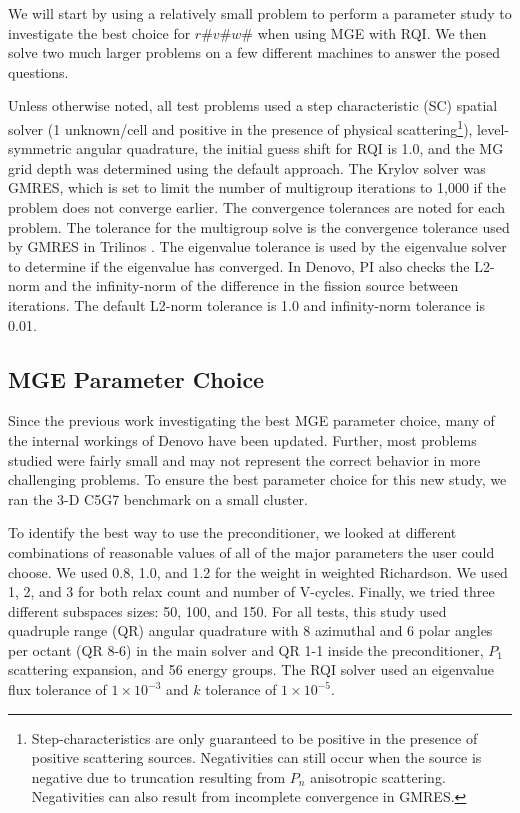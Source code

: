 \documentclass{article}                                                                           %
\begin{document}
We will start by using a relatively small problem to perform a parameter study to investigate the best choice for $r\#v\#w\#$ when using MGE with RQI.
We then solve two much larger problems on a few different machines to answer the posed questions.

Unless otherwise noted, all test problems used a step characteristic (SC) spatial solver (1 unknown/cell and positive in the presence of physical scattering\footnote{Step-characteristics are only guaranteed to be positive in the presence of positive scattering sources. Negativities can still occur when the source is negative due to truncation resulting from $P_n$ anisotropic scattering. Negativities can also result from incomplete convergence in GMRES.}), level-symmetric angular quadrature, the initial guess shift for RQI is 1.0, and the MG grid depth was determined using the default approach. 
The Krylov solver was GMRES, which is set to limit the number of multigroup iterations to 1,000 if the problem does not converge earlier. The convergence tolerances are noted for each problem. The tolerance for the multigroup solve is the convergence tolerance used by GMRES in Trilinos \cite{1089021}. The eigenvalue tolerance is used by the eigenvalue solver to determine if the eigenvalue has converged. In Denovo, PI also checks the L2-norm and the infinity-norm of the difference in the fission source between iterations. The default L2-norm tolerance is 1.0 and infinity-norm tolerance is 0.01.


\subsection{MGE Parameter Choice}
\label{subsec:mge-params}

Since the previous work investigating the best MGE parameter choice, many of the internal workings of Denovo have been updated. 
Further, most problems studied were fairly small and may not represent the correct behavior in more challenging problems. 
To ensure the best parameter choice for this new study, we ran the 3-D C5G7 benchmark on a small cluster. 

To identify the best way to use the preconditioner, we looked at different combinations of reasonable values of all of the major parameters the user could choose. 
We used 0.8, 1.0, and 1.2 for the weight in weighted Richardson. 
We used 1, 2, and 3 for both relax count and number of V-cycles. 
Finally, we tried three different subspaces sizes: 50, 100, and 150. 
For all tests, this study used quadruple range (QR) angular quadrature \cite{Jarrell2009} with 8 azimuthal and 6 polar angles per octant (QR 8-6) in the main solver and QR 1-1 inside the preconditioner, $P_1$ scattering expansion, and 56 energy groups. 
The RQI solver used an eigenvalue flux tolerance of $1\times 10^{-3}$ and $k$ tolerance of $1\times 10^{-5}$. 
\end{document}
